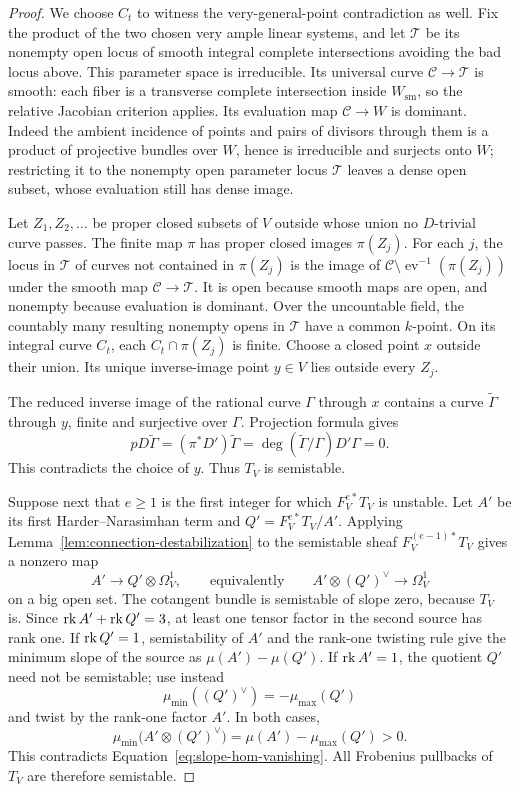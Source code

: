 \begin{proof}
We choose $C_t$ to witness the very-general-point contradiction as well.
Fix the product of the two chosen very ample linear systems, and let
$\mathcal T$ be its nonempty open locus of smooth integral complete
intersections avoiding the bad locus above.  This parameter space is
irreducible.  Its universal curve $\mathcal C\to\mathcal T$ is smooth:
each fiber is a transverse complete intersection inside $W_{\mathrm{sm}}$,
so the relative Jacobian criterion applies.  Its evaluation map
$\mathcal C\to W$ is dominant.  Indeed the ambient incidence of points
and pairs of divisors through them is a product of projective bundles
over $W$, hence is irreducible and surjects onto $W$; restricting it to
the nonempty open parameter locus $\mathcal T$ leaves a dense open
subset, whose evaluation still has dense image.

Let $Z_1,Z_2,\ldots$ be proper closed subsets of $V$ outside whose union
no $D$-trivial curve passes.  The finite map $\pi$ has proper closed
images $\pi(Z_j)$.  For each $j$, the locus in $\mathcal T$ of curves not
contained in $\pi(Z_j)$ is the image of
$\mathcal C\setminus\operatorname{ev}^{-1}(\pi(Z_j))$ under the smooth
map $\mathcal C\to\mathcal T$.  It is open because smooth maps are open,
and nonempty because evaluation is dominant.  Over the uncountable field,
the countably many resulting nonempty opens in $\mathcal T$ have a common
$k$-point.  On its integral curve $C_t$, each $C_t\cap\pi(Z_j)$ is finite.
Choose a closed point $x$ outside their union.  Its unique inverse-image
point $y\in V$ lies outside every $Z_j$.

The reduced inverse image of the rational curve $\Gamma$ through $x$
contains a curve $\widetilde\Gamma$ through $y$, finite and surjective
over $\Gamma$.  Projection formula gives
\[
  pD\widetilde\Gamma
  =(\pi^*D')\widetilde\Gamma
  =\deg(\widetilde\Gamma/\Gamma)D'\Gamma=0.
\]
This contradicts the choice of $y$.  Thus $T_V$ is semistable.

Suppose next that $e\ge1$ is the first integer for which
$F_V^{e*}T_V$ is unstable.  Let $A'$ be its first Harder--Narasimhan term
and $Q'=F_V^{e*}T_V/A'$.  Applying
Lemma~\ref{lem:connection-destabilization} to the semistable sheaf
$F_V^{(e-1)*}T_V$ gives a nonzero map
\[
  A'\longrightarrow Q'\otimes\Omega_V^1,
  \qquad\text{equivalently}\qquad
  A'\otimes(Q')^\vee\longrightarrow\Omega_V^1
\]
on a big open set.  The cotangent bundle is semistable of slope zero,
because $T_V$ is.  Since $\operatorname{rk} A'+\operatorname{rk} Q'=3$, at least one tensor factor
in the second source has rank one.  If $\operatorname{rk} Q'=1$, semistability of
$A'$ and the rank-one twisting rule give the minimum slope of the source
as $\mu(A')-\mu(Q')$.  If $\operatorname{rk} A'=1$, the quotient $Q'$ need not be
semistable; use instead
\[
  \mu_{\min}((Q')^\vee)=-\mu_{\max}(Q')
\]
and twist by the rank-one factor $A'$.  In both cases,
\[
  \mu_{\min}\bigl(A'\otimes(Q')^\vee\bigr)
  =\mu(A')-\mu_{\max}(Q')>0.
\]
This contradicts Equation~\eqref{eq:slope-hom-vanishing}.  All Frobenius
pullbacks of $T_V$ are therefore semistable.


\end{proof}
